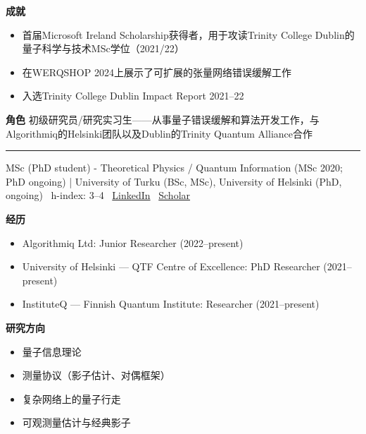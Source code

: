 \par{\footnotesize\color{mainred}\textbf{成就}}
\begin{itemize}[leftmargin=1.2em,itemsep=0pt,topsep=0pt]
\item {\footnotesize 首届Microsoft Ireland Scholarship获得者，用于攻读Trinity College Dublin的量子科学与技术MSc学位（2021/22）}
\item {\footnotesize 在WERQSHOP 2024上展示了可扩展的张量网络错误缓解工作}
\item {\footnotesize 入选Trinity College Dublin Impact Report 2021–22}
\end{itemize}
\par{\footnotesize\color{mainred}\textbf{角色}} {\footnotesize 初级研究员/研究实习生——从事量子错误缓解和算法开发工作，与Algorithmiq的Helsinki团队以及Dublin的Trinity Quantum Alliance合作}
\vspace{2pt}\hrule\vspace{2pt}
\vspace{4pt}
\par{\footnotesize\color{graytext}MSc (PhD student) - Theoretical Physics / Quantum Information (MSc 2020; PhD ongoing) | University of Turku (BSc, MSc), University of Helsinki (PhD, ongoing) \textbar\  h-index: 3–4 \textbar\  \href{https://www.linkedin.com/in/joonas-malmi-1a5466238/}{LinkedIn} \textbar\  \href{Not publicly found (MathSciNet author ID: 1624464)}{Scholar}}
\par{\footnotesize\color{mainred}\textbf{经历}}
\begin{itemize}[leftmargin=1.2em,itemsep=0pt,topsep=0pt]
\item {\footnotesize Algorithmiq Ltd: Junior Researcher (2022–present)}
\item {\footnotesize University of Helsinki — QTF Centre of Excellence: PhD Researcher (2021–present)}
\item {\footnotesize InstituteQ — Finnish Quantum Institute: Researcher (2021–present)}
\end{itemize}
\par{\footnotesize\color{mainred}\textbf{研究方向}}
\begin{itemize}[leftmargin=1.2em,itemsep=0pt,topsep=0pt]
\item {\footnotesize 量子信息理论}
\item {\footnotesize 测量协议（影子估计、对偶框架）}
\item {\footnotesize 复杂网络上的量子行走}
\item {\footnotesize 可观测量估计与经典影子}
\end{itemize}

